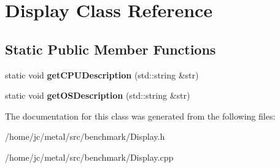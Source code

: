\hypertarget{classDisplay}{}\section{Display Class Reference}
\label{classDisplay}
\subsection*{Static Public Member Functions}
\begin{DoxyCompactItemize}
\item 
\hypertarget{classDisplay_add7183a29b473e35d3dc9b85172560e8}{}static void {\bfseries get\+C\+P\+U\+Description} (std\+::string \&str)\label{classDisplay_add7183a29b473e35d3dc9b85172560e8}

\item 
\hypertarget{classDisplay_a3bed00f180043a15209c9010e98aa874}{}static void {\bfseries get\+O\+S\+Description} (std\+::string \&str)\label{classDisplay_a3bed00f180043a15209c9010e98aa874}

\end{DoxyCompactItemize}


The documentation for this class was generated from the following files\+:\begin{DoxyCompactItemize}
\item 
/home/jc/metal/src/benchmark/Display.\+h\item 
/home/jc/metal/src/benchmark/Display.\+cpp\end{DoxyCompactItemize}
